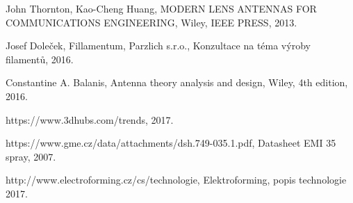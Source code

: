 
\begin{thebibliography}{9}

  John Thornton,
  Kao-Cheng Huang,
  MODERN LENS ANTENNAS FOR COMMUNICATIONS ENGINEERING,
  Wiley,
  IEEE PRESS,
  2013.

  Josef Doleček,
  Fillamentum,
  Parzlich s.r.o.,
  Konzultace na téma výroby filamentů,
  2016.

  Constantine A. Balanis,
  Antenna theory analysis and design,
  Wiley,
  4th edition,
  2016.

  https://www.3dhubs.com/trends,
  2017.

  https://www.gme.cz/data/attachments/dsh.749-035.1.pdf,
  Datasheet EMI 35 spray,
  2007.

  http://www.electroforming.cz/cs/technologie,
  Elektroforming, popis technologie 
  2017.
  

\end{thebibliography}

\newpage

\listoffigures

